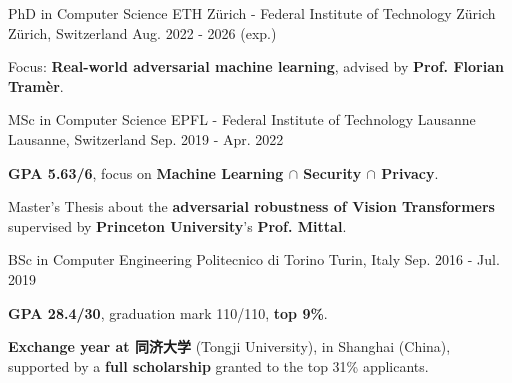 

\begin{cventries}
  \cventry
  {PhD in Computer Science} %
  {ETH Z{\"u}rich - Federal Institute of Technology Z{\"u}rich} %
  {Z{\"u}rich, Switzerland} %
  {Aug. 2022 - 2026 (exp.)} %
  {
    \begin{cvitems} %
      \item Focus: \textbf{Real-world adversarial machine learning}, advised by \textbf{Prof. Florian Tram{\`e}r}.
    \end{cvitems}
  }
  
  \cventry
  {MSc in Computer Science} %
  {EPFL - Federal Institute of Technology Lausanne} %
  {Lausanne, Switzerland} %
  {Sep. 2019 - Apr. 2022} %
  {
    \begin{cvitems} %
      \item \textbf{GPA 5.63/6}, focus on \textbf{Machine Learning $\cap$ Security $\cap$ Privacy}.
      \item Master's Thesis about the \textbf{adversarial robustness of Vision Transformers} supervised by \textbf{Princeton University}'s \textbf{Prof. Mittal}.
    \end{cvitems}
  }
  
  \cventry
  {BSc in Computer Engineering} %
  {Politecnico di Torino} %
  {Turin, Italy} %
  {Sep. 2016 - Jul. 2019} %
  {
    \begin{cvitems} %
      \item \textbf{GPA 28.4/30}, graduation mark 110/110, \textbf{top 9\%}.
      \item \textbf{Exchange year at 同济大学} (Tongji University), in Shanghai (China), supported by a \textbf{full scholarship} granted to the top 31\% applicants. \vspace{0.2cm}
    \end{cvitems}
  }

\vspace{-0.4cm}
\end{cventries}
